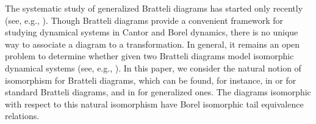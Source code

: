 \documentclass[11pt, twoside]{amsart}
\theoremstyle{definition}
\theoremstyle{remark}
\theoremstyle{plain}
\newcommand{\tcr}{\textcolor{red}}
\numberwithin{equation}{section}
\begin{document}
The systematic study of generalized Bratteli diagrams has started only recently (see, e.g.,  \cite{BezuglyiJorgensenSanadhya2024, BezuglyiJorgensenKarpelSanadhya2025, BezuglyiKarpelKwiatkowskiWata2024,BezuglyiJorgensenKarpelKwiatkowski2025, BezuglyiDudkoKarpel2024, BezuglyiJorgensenKarpelSanadhyaRaszeja2026}). 
Though Bratteli diagrams provide a convenient framework for studying dynamical systems in Cantor and Borel dynamics, there is no unique way to associate a diagram to a transformation. 
In general, it remains an open problem to determine whether given two Bratteli diagrams model isomorphic dynamical systems (see, e.g., \cite{DownarowiczKarpel_2019}). 
In this paper, we consider the natural notion of isomorphism for Bratteli diagrams, which can be found, for instance, in  \cite[Section 2]{HermanPutnamSkau1992} or \cite[Subsection 6.3.1]{Durand2010} for standard Bratteli diagrams, and in \cite{BezuglyiJorgensenKarpelSanadhya2025} for generalized ones. 
The diagrams isomorphic with respect to this natural isomorphism have Borel isomorphic tail equivalence relations. 
\end{document}
